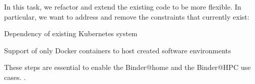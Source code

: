 \begin{task}[
  title=Reducing technical constraints for broader usage,
  id=constraints,
  lead=SRL,
  PM=1,
  wphases={0-36},
  partners={MP}
]

In this task, we refactor and extend the existing code to be more flexible. In
particular, we want to address and remove the constraints that currently exist:

\begin{compactitem}
  \item Dependency of existing Kubernetes system
  \item Support of only Docker containers to host created software environments
  \end{compactitem}

These steps are essential to enable the Binder@home and the Binder@HPC use
cases. .
  
\end{task}
